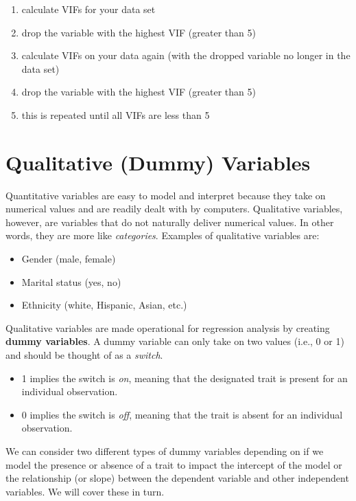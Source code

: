 \documentclass[
]{book}
\begin{document}
\begin{enumerate}
\def\labelenumi{\arabic{enumi}.}
\item
  calculate VIFs for your data set
\item
  drop the variable with the highest VIF (greater than 5)
\item
  calculate VIFs on your data again (with the dropped variable no longer in the data set)
\item
  drop the variable with the highest VIF (greater than 5)
\item
  this is repeated until all VIFs are less than 5
\end{enumerate}

\hypertarget{DVS}{%
\chapter{Qualitative (Dummy) Variables}\label{DVS}}

Quantitative variables are easy to model and interpret because they take on numerical values and are readily dealt with by computers. Qualitative variables, however, are variables that do not naturally deliver numerical values. In other words, they are more like \emph{categories}. Examples of qualitative variables are:

\begin{itemize}
\item
  Gender (male, female)
\item
  Marital status (yes, no)
\item
  Ethnicity (white, Hispanic, Asian, etc.)
\end{itemize}

Qualitative variables are made operational for regression analysis by creating \textbf{dummy variables}. A dummy variable can only take on two values (i.e., 0 or 1) and should be thought of as a \emph{switch}.

\begin{itemize}
\item
  1 implies the switch is \emph{on}, meaning that the designated trait is present for an individual observation.
\item
  0 implies the switch is \emph{off}, meaning that the trait is absent for an individual observation.
\end{itemize}

We can consider two different types of dummy variables depending on if we model the presence or absence of a trait to impact the intercept of the model or the relationship (or slope) between the dependent variable and other independent variables. We will cover these in turn.
\end{document}
